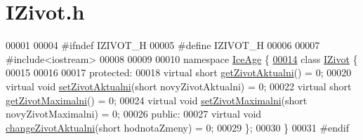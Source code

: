 \hypertarget{IZivot_8h_source}{}\section{I\+Zivot.\+h}
\label{IZivot_8h_source}

\begin{DoxyCode}
00001 
00004 \textcolor{preprocessor}{#ifndef IZIVOT\_H}
00005 \textcolor{preprocessor}{#define IZIVOT\_H}
00006 
00007 \textcolor{preprocessor}{#include<iostream>}
00008 
00009 
00010 \textcolor{keyword}{namespace }\hyperlink{namespaceIceAge}{IceAge} \{
\hypertarget{IZivot_8h_source.tex_l00014}{}\hyperlink{classIceAge_1_1IZivot}{00014}     \textcolor{keyword}{class }\hyperlink{classIceAge_1_1IZivot}{IZivot} \{
00015 
00016 
00017     \textcolor{keyword}{protected}:
00018         \textcolor{keyword}{virtual} \textcolor{keywordtype}{short} \hyperlink{classIceAge_1_1IZivot_aac99c9db4859e3f17f0334fa6db93933}{getZivotAktualni}() = 0;
00020         \textcolor{keyword}{virtual} \textcolor{keywordtype}{void} \hyperlink{classIceAge_1_1IZivot_ab5dd4fbf3c05f15fe732e644ce0a15be}{setZivotAktualni}(\textcolor{keywordtype}{short} novyZivotAktualni) = 0;
00022         \textcolor{keyword}{virtual} \textcolor{keywordtype}{short} \hyperlink{classIceAge_1_1IZivot_ab5b8c647c30c5f325ddd6066220e1fc9}{getZivotMaximalni}() = 0;
00024         \textcolor{keyword}{virtual} \textcolor{keywordtype}{void} \hyperlink{classIceAge_1_1IZivot_aab09686c086958de400579d031d4ed8e}{setZivotMaximalni}(\textcolor{keywordtype}{short} novyZivotMaximalni) = 0;
00026     \textcolor{keyword}{public}:
00027         \textcolor{keyword}{virtual} \textcolor{keywordtype}{void} \hyperlink{classIceAge_1_1IZivot_a01f6798ca546ceece0d707bc85076d9c}{changeZivotAktualni}(\textcolor{keywordtype}{short} hodnotaZmeny) = 0;
00029     \};
00030 \}
00031 \textcolor{preprocessor}{#endif}
\end{DoxyCode}
